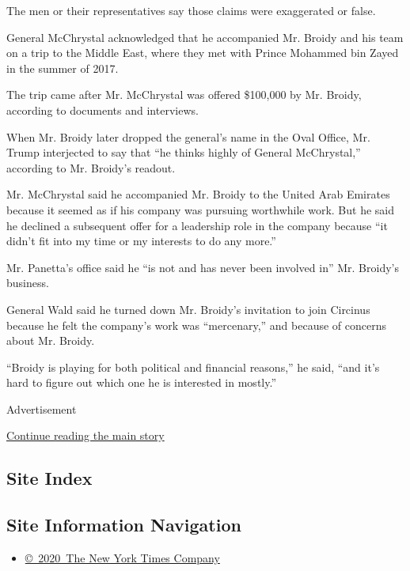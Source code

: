 The men or their representatives say those claims were exaggerated or
false.

General McChrystal acknowledged that he accompanied Mr. Broidy and his
team on a trip to the Middle East, where they met with Prince Mohammed
bin Zayed in the summer of 2017.

The trip came after Mr. McChrystal was offered \$100,000 by Mr. Broidy,
according to documents and interviews.

When Mr. Broidy later dropped the general's name in the Oval Office, Mr.
Trump interjected to say that ``he thinks highly of General
McChrystal,'' according to Mr. Broidy's readout.

Mr. McChrystal said he accompanied Mr. Broidy to the United Arab
Emirates because it seemed as if his company was pursuing worthwhile
work. But he said he declined a subsequent offer for a leadership role
in the company because ``it didn't fit into my time or my interests to
do any more.''

Mr. Panetta's office said he ``is not and has never been involved in''
Mr. Broidy's business.

General Wald said he turned down Mr. Broidy's invitation to join
Circinus because he felt the company's work was ``mercenary,'' and
because of concerns about Mr. Broidy.

``Broidy is playing for both political and financial reasons,'' he said,
``and it's hard to figure out which one he is interested in mostly.''

Advertisement

\protect\hyperlink{after-bottom}{Continue reading the main story}

\hypertarget{site-index}{%
\subsection{Site Index}\label{site-index}}

\hypertarget{site-information-navigation}{%
\subsection{Site Information
Navigation}\label{site-information-navigation}}

\begin{itemize}
\tightlist
\item
  \href{https://help.nytimes.com/hc/en-us/articles/115014792127-Copyright-notice}{©~2020~The
  New York Times Company}
\end{itemize}

